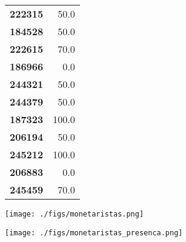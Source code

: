 \documentclass[11pt]{article}
\begin{document}
\begin{center}
\begin{longtable}{lr}
\textbf{222315} &                  50.0 \\
\textbf{184528} &                  50.0 \\
\textbf{222615} &                  70.0 \\
\textbf{186966} &                   0.0 \\
\textbf{244321} &                  50.0 \\
\textbf{244379} &                  50.0 \\
\textbf{187323} &                 100.0 \\
\textbf{206194} &                  50.0 \\
\textbf{245212} &                 100.0 \\
\textbf{206883} &                   0.0 \\
\textbf{245459} &                  70.0 \\
\end{longtable}
\end{center}
\begin{center}
\texttt{[image: ./figs/monetaristas.png]}
\end{center}

\begin{center}
\texttt{[image: ./figs/monetaristas\_presenca.png]}
\end{center}
\end{document}
